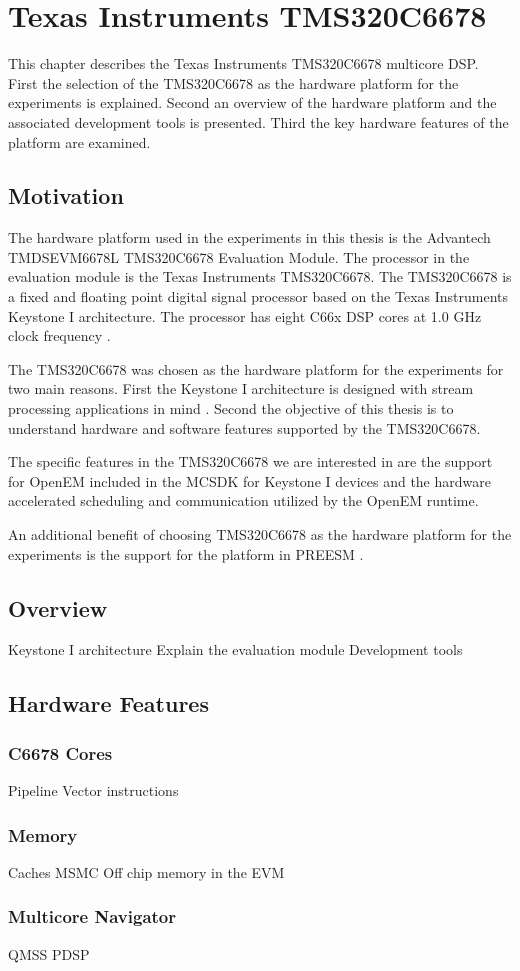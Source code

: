\chapter{Texas Instruments TMS320C6678}
\label{chapter:c6678}
This chapter describes the Texas Instruments TMS320C6678 multicore DSP. First
the selection of the TMS320C6678 as the hardware platform for the experiments
is explained. Second an overview of the hardware platform and the associated
development tools is presented. Third the key hardware features of the 
platform are examined.

\section{Motivation}
The hardware platform used in the experiments in this thesis is the  
Advantech TMDSEVM6678L TMS320C6678 Evaluation Module. The processor in the
evaluation module is the Texas Instruments TMS320C6678. The TMS320C6678
is a fixed and floating point digital signal processor based on the
Texas Instruments Keystone I architecture. The processor has eight
C66x DSP cores at 1.0 GHz clock frequency \cite{tmsdatasheet}.

The TMS320C6678 was chosen as the hardware platform for the experiments
for two main reasons. First the Keystone I architecture is designed with
stream processing applications in mind \cite{multicorevideo}. Second the
objective of this thesis is to understand hardware and software features
supported by the TMS320C6678.

The specific features in the TMS320C6678 we are interested in are the
support for OpenEM included in the MCSDK for Keystone I devices
\cite{MCSDKbrochure} and the hardware accelerated scheduling and
communication utilized by the OpenEM runtime. 

An additional benefit of choosing TMS320C6678 as the hardware platform for
the experiments is the support for the platform in PREESM
\cite{pelcat2014preesm}.
\section{Overview}
Keystone I architecture
Explain the evaluation module
Development tools

\section{Hardware Features}
\subsection{C6678 Cores}
Pipeline
Vector instructions
\subsection{Memory}
Caches
MSMC
Off chip memory in the EVM
\subsection{Multicore Navigator}
QMSS
PDSP


